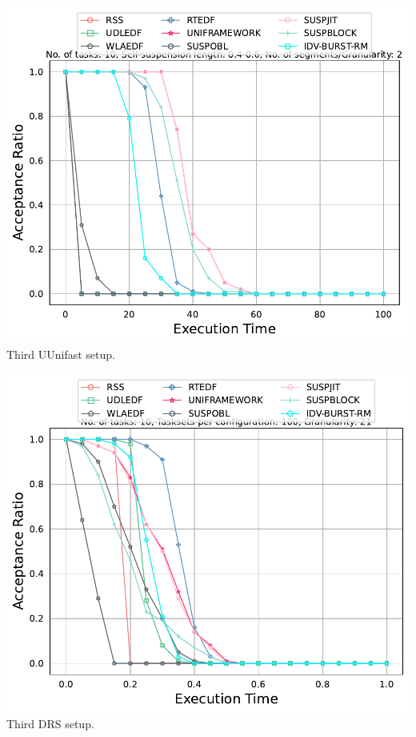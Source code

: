 \documentclass[]{article}
\begin{document}
        \clearpage
        
	\begin{minipage}[t]{0.48\linewidth}
		\centering
			
		\includegraphics[width=\linewidth]{comparison_3rdSetups_uni.pdf}
		Third UUnifast setup.
		\vspace{0.3cm}
		
		
	\end{minipage}\hfill
	\begin{minipage}[t]{0.48\linewidth}
		\centering
		
                   
		\includegraphics[width=\linewidth]{comaprison_3rdSetup_DRS.pdf}
		Third DRS setup.
		\vspace{0.3cm}
	\end{minipage}
        \clearpage
\end{document}
